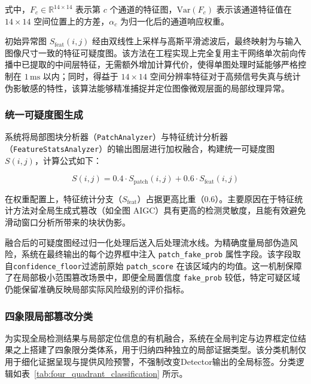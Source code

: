 \documentclass[UTF8, a4paper, 12pt]{ctexart}
\begin{document}
式中，$F_c \in \mathbb{R}^{14 \times 14}$ 表示第 $c$ 个通道的特征图，$\text{Var}(F_c)$ 表示该通道特征值在 $14 \times 14$ 空间位置上的方差，$\alpha_c$ 为归一化后的通道响应权重。

初始异常图 $S_{\text{feat}}(i,j)$ 经由双线性上采样与高斯平滑滤波后，最终映射为与输入图像尺寸一致的特征可疑度图。该方法在工程实现上完全复用主干网络单次前向传播中已提取的中间层特征，无需额外增加计算代价，使得单图处理时延能够严格控制在 $1\,\text{ms}$ 以内；同时，得益于 $14 \times 14$ 空间分辨率特征对于高频信号失真与统计伪影敏感的特性，该算法能够精准捕捉并定位图像微观层面的局部纹理异常。

\subsubsection{统一可疑度图生成}

系统将局部图块分析器（\texttt{PatchAnalyzer}）与特征统计分析器（\texttt{FeatureStatsAnalyzer}）的输出图层进行加权融合，构建统一可疑度图 $S(i,j)$，计算公式如下：

\begin{equation}
S(i,j) = 0.4 \cdot S_{\text{patch}}(i,j) + 0.6 \cdot S_{\text{feat}}(i,j)
\end{equation}

在权重配置上，特征统计分支（$S_{\text{feat}}$）占据更高比重（$0.6$）。主要原因在于特征统计方法对全局生成式篡改（如全图 AIGC）具有更高的检测灵敏度，且能有效避免滑动窗口分析所带来的块状伪影。

融合后的可疑度图经过归一化处理后送入后处理流水线。为精确度量局部伪造风险，系统在最终输出的每个边界框中注入 \texttt{patch\_fake\_prob} 属性字段。该字段取自\texttt{confidence\_floor}过滤前原始 \texttt{patch\_score} 在该区域内的均值。这一机制保障了在局部极小范围篡改场景中，即便全局置信度 \texttt{fake\_prob} 较低，特定可疑区域仍能保留准确反映局部实际风险级别的评价指标。

\subsubsection{四象限局部篡改分类}

为实现全局检测结果与局部定位信息的有机融合，系统在全局判定与边界框定位结果之上搭建了四象限分类体系，用于归纳四种独立的局部证据类型。该分类机制仅用于细化证据呈现与提供风险预警，不强制改变Detector输出的全局标签。分类逻辑如表~\ref{tab:four_quadrant_classification} 所示。
\end{document}
